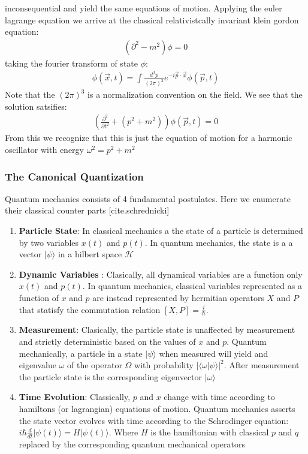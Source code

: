 inconsequential and yield the same equations of  motion.
Applying the euler lagrange equation we arrive at the 
classical relativistcally invariant klein gordon equation:
\begin{align*}
(\partial^2 - m^2 ) \phi = 0
\end{align*}
taking the fourier transform of state $\phi$:
\begin{align*}
\phi(\vec x, t) = \int \frac{d^3p}{(2\pi)^3} e^{-i \vec p \cdot \vec x } \phi (\vec p, t)
\end{align*}
Note that the $(2\pi)^3$ is a normalization convention on the field. We see that the solution satsifies:
\begin{align*}
\left( \frac{\partial^2 }{\partial t^2} + (p^2 + m^2) \right ) \phi(\vec p, t)= 0
\end{align*}
From this we recognize that this is just the equation of motion for
 a harmonic oscillator with energy $\omega^2 = p^2 + m^2$

\subsubsection{The Canonical Quantization}

Quantum mechanics consists of 4 fundamental postulates. Here we enumerate their classical counter parts [cite.schrednicki]

\begin{enumerate}
\item \textbf{Particle State}: In classical mechanics a the state of a particle is determined by two variables $x(t)$ and $p(t)$. In quantum mechanics, the state is a a vector $|\psi \rangle$ in a hilbert space $\mathcal{H}$
\item \textbf{Dynamic Variables }: Clasically, all dynamical variables are a
 function only $x(t)$ and $p(t)$. In quantum mechanics, classical variables 
represented as a function of $x$ and $p$ are instead 
represented by hermitian operators $X$ and $P$ that statisfy the commutation 
relation $[X,P] = \frac{i}\hbar$. 
\item \textbf{Measurement}: Clasically, the particle state is unaffected by measurement and strictly
deterministic based on the values of $x$ and $p$. Quantum mechanically, a particle in a state $|\psi \rangle$ when measured will yield and eigenvalue $\omega$ of the operator $\Omega$ with probability
$|\langle\omega|\psi \rangle|^2$. After measurement the particle state is the corresponding eigenvector  $|\omega\rangle$
\item \textbf{Time Evolution}: Classically, $p$ and $x$ change with time according to hamiltons (or lagrangian) equations of motion. Quantum mechanics asserts the state vector evolves with time according to the
Schrodinger equation: $i \hbar \frac{d}{dt}|\psi(t) \rangle = H | \psi(t) \rangle$. Where $H$ is the 
hamiltonian with classical $p$ and $q$ replaced by the corresponding quantum mechanical operators
\end{enumerate}

